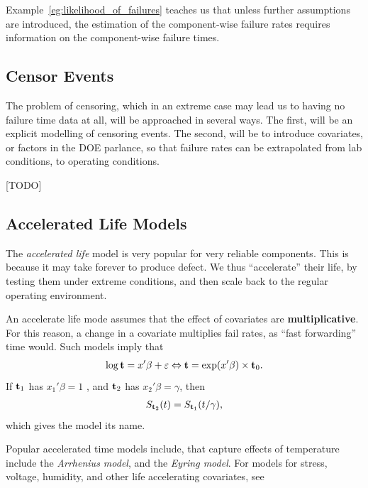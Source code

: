 Example~\ref{eg:likelihood_of_failures} teaches us that unless further assumptions are introduced, the estimation of the component-wise failure rates requires information on the component-wise failure times. 





\subsection{Censor Events}
The problem of censoring, which in an extreme case may lead us to having no failure time data at all, will be approached in several ways. The first, will be an explicit modelling of censoring events.
The second, will be to introduce covariates, or factors in the DOE parlance, so that failure rates can be extrapolated from lab conditions, to operating conditions.


[TODO]





\subsection{Accelerated Life Models}
The \emph{accelerated life} model is very popular for very reliable components. This is because it may take forever to produce defect. We thus ``accelerate'' their life, by testing them under extreme conditions, and then scale back to the regular operating environment.

An accelerate life mode assumes that the effect of covariates are \textbf{multiplicative}. For this reason, a change in a covariate multiplies fail rates, as ``fast forwarding'' time would. 
Such models imply that 
\begin{align}
	\log \mathbf{t} = x'\beta + \varepsilon \Leftrightarrow \mathbf{t} = \exp(x'\beta) \times \mathbf{t}_0.
\end{align}
If $\mathbf{t}_1$ has $x_1'\beta=1$ , and $\mathbf{t}_2$ has $x_2'\beta=\gamma$, then 
\begin{align}
S_{\mathbf{t}_2} (t)=S_{\mathbf{t}_1} (t/\gamma),
\end{align}
which gives the model its name.

Popular accelerated time models include, that capture effects of temperature include the \emph{Arrhenius model}, and the \emph{Eyring model}.
For models for stress, voltage, humidity, and other life accelerating covariates, see \cite[Sec.8.1.5]{natrella_nist/sematech_2010}





